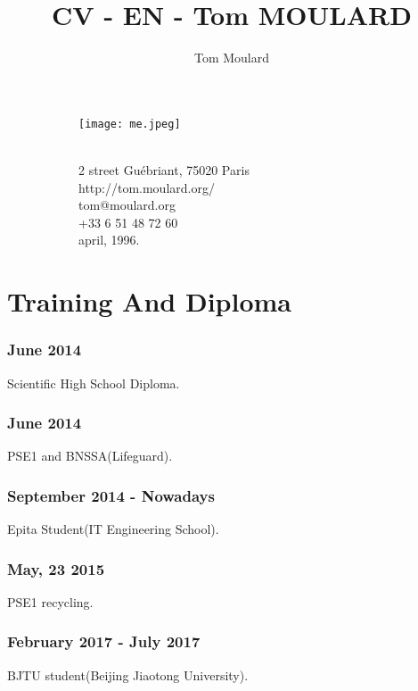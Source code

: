 \documentclass{article}
\begin{document}
    \title{CV - EN - Tom MOULARD}

    \author{Tom Moulard}


    \begin{center}
        \begin{figure}
            \centering
            \begin{subfigure}[b]{0.3\textwidth}
                \texttt{[image: me.jpeg]}
            \end{subfigure}
            \begin{subfigure}[b]{0.3\textwidth}
                {\huge\bfseries\theauthor}\\
                \vspace{.25em}
                2 street Gu\'ebriant, 75020 Paris\\
                http://tom.moulard.org/\\
                tom@moulard.org\\
                +33 6 51 48 72 60\\
                april,  1996.
            \end{subfigure}
        \end{figure}
    \end{center}

    \section{Training And Diploma}
        \subsubsection{June 2014}
            Scientific High School Diploma.
        \subsubsection{June 2014}
            PSE1 and BNSSA(Lifeguard).
        \subsubsection{September 2014 - Nowadays}
            Epita Student(IT Engineering School).
        \subsubsection{May, 23 2015}
            PSE1 recycling.
        \subsubsection{February 2017 - July 2017}
            BJTU student(Beijing Jiaotong University).
\end{document}
